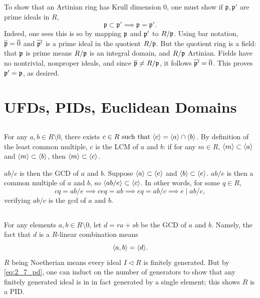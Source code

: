 \documentclass[12pt]{article}
\begin{document}
To show that an Artinian ring has Krull dimension 0, one must show if $\mathfrak{p}, \mathfrak{p}'$ are prime ideals in $R$, 
$$\mathfrak{p} \subset \mathfrak{p}' \implies \mathfrak{p} = \mathfrak{p}'.$$ 
Indeed, one sees this is so by mapping $\mathfrak{p}$ and $\mathfrak{p}'$ to $R / \mathfrak{p}$.
Using bar notation, $\overline{\mathfrak{p}} = \overline{0}$ and $\overline{\mathfrak{p}'}$ is a prime ideal in the quotient $R / \mathfrak{p}$. 
But the quotient ring is a field: that $\mathfrak{p}$ is prime means $R / \mathfrak{p}$ is an integral domain, and $R / \mathfrak{p}$ Artinian. 
Fields have no nontrivial, nonproper ideals, and since $\overline{\mathfrak{p}} \neq R / \mathfrak{p}$, it follows $\overline{\mathfrak{p}'} = \overline{0}$. 
This proves $\mathfrak{p}' = \mathfrak{p}$, as desired. 

\section{UFDs, PIDs, Euclidean Domains} 
\setcounter{subsection}{5}
\subsection{} 
For any $a, b \in R \setminus 0$, there exists $c \in R \text{ such that } \langle c\rangle = \langle a\rangle \cap \langle b\rangle$. 
By definition of the least common multiple, $c$ is the LCM of $a$ and $b$: 
if for any $m \in R$, $\langle m\rangle \subset \langle a\rangle$ and $\langle m\rangle \subset \langle b\rangle$, then $\langle m\rangle \subset \langle c\rangle$. 

$ab / c$ is then the GCD of $a$ and $b$.
Suppose $\langle a\rangle \subset \langle e\rangle$ and $\langle b\rangle \subset \langle e\rangle$. 
$ab / e$ is then a common multiple of $a$ and $b$, so $\langle ab / e\rangle \subset \langle c\rangle$. 
In other words, for some $q \in R$, 
$$cq = ab / e \implies ceq = ab \implies eq = ab / c \implies e \mid ab/c,$$
verifying $ab / c$ is the gcd of $a$ and $b$. 

\subsection{} 
For any elements $a, b \in R \setminus 0$, let $d = ra + sb$ be the GCD of $a$ and $b$. 
Namely, the fact that $d$ is a $R$-linear combination means  
\begin{equation} \label{eq:2_7_pd}
  \langle a, b\rangle = \langle d\rangle.
\end{equation}
$R$ being Noetherian means every ideal $I \lhd R$ is finitely generated. 
But by \eqref{eq:2_7_pd}, one can induct on the number of generators to show that any finitely generated ideal is in in fact generated by a single element;
this shows $R$ is a PID. 
\end{document}
